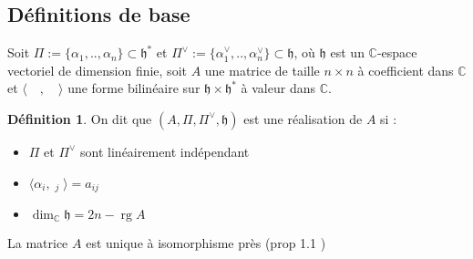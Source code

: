 \documentclass[12pt]{article}
\DeclareMathOperator{\rg}{rg}
\DeclareMathOperator{\alpv}{\alpha^{\vee}}
\theoremstyle{definition}
\newtheorem{Def}{Définition}[section]
\begin{document}
\subsection{Définitions de base}
Soit $\Pi:=\{\alpha_1,..,\alpha_n\}\subset\mathfrak{h^{\ast}}$ et $\Pi^{\vee}:=\{\alpha_1^{\vee},..,\alpha_n^{\vee}\}\subset\mathfrak{h}$, où $\mathfrak{h}$ est un $\mathbb{C}$-espace vectoriel de dimension finie, soit $A$ une matrice de taille $n\times n$ à coefficient dans $\mathbb{C}$ et $\langle\quad,\quad \rangle$ une forme bilinéaire sur $\mathfrak{h}\times\mathfrak{h}^{\ast}$ à valeur dans $\mathbb{C}$. 
\begin{Def} On dit que $(A,\Pi,\Pi^{\vee},\mathfrak{h})$ est une réalisation de $A$ si : \begin{itemize}
\item $\Pi$ et $\Pi^{\vee}$ sont linéairement indépendant
\item $\langle\alpha_i,\alpv_j\rangle =a_{ij}$
\item $\dim_{\mathbb{C}}\mathfrak{h}=2n-\rg A$
\end{itemize} \end{Def} La matrice $A$ est unique à isomorphisme près (prop 1.1 \cite{Kac})\vspace{0.5cm}
\end{document}
